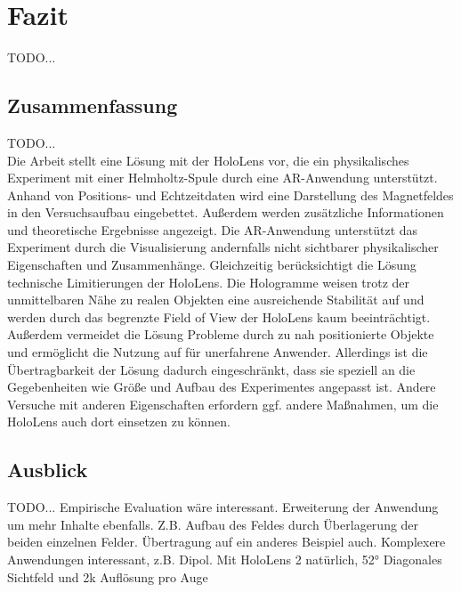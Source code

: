 \section{Fazit}

TODO...

\subsection{Zusammenfassung}
TODO...\\
Die Arbeit stellt eine Lösung mit der HoloLens vor, die ein physikalisches Experiment mit einer Helmholtz-Spule durch eine AR-Anwendung unterstützt. Anhand von Positions- und Echtzeitdaten wird eine Darstellung des Magnetfeldes in den Versuchsaufbau eingebettet. Außerdem werden zusätzliche Informationen und theoretische Ergebnisse angezeigt. Die AR-Anwendung unterstützt das Experiment durch die Visualisierung andernfalls nicht sichtbarer physikalischer Eigenschaften und Zusammenhänge. Gleichzeitig berücksichtigt die Lösung technische Limitierungen der HoloLens. Die Hologramme weisen trotz der unmittelbaren Nähe zu realen Objekten eine ausreichende Stabilität auf und werden durch das begrenzte Field of View der HoloLens kaum beeinträchtigt. Außerdem vermeidet die Lösung Probleme durch zu nah positionierte Objekte und ermöglicht die Nutzung auf für unerfahrene Anwender. Allerdings ist die Übertragbarkeit der Lösung dadurch eingeschränkt, dass sie speziell an die Gegebenheiten wie Größe und Aufbau des Experimentes angepasst ist. Andere Versuche mit anderen Eigenschaften erfordern ggf. andere Maßnahmen, um die HoloLens auch dort einsetzen zu können.

\subsection{Ausblick}
TODO...
Empirische Evaluation wäre interessant. Erweiterung der Anwendung um mehr Inhalte ebenfalls. Z.B. Aufbau des Feldes durch Überlagerung der beiden einzelnen Felder. Übertragung auf ein anderes Beispiel auch. Komplexere Anwendungen interessant, z.B. Dipol. Mit HoloLens 2 natürlich, 52° Diagonales Sichtfeld und 2k Auflösung pro Auge